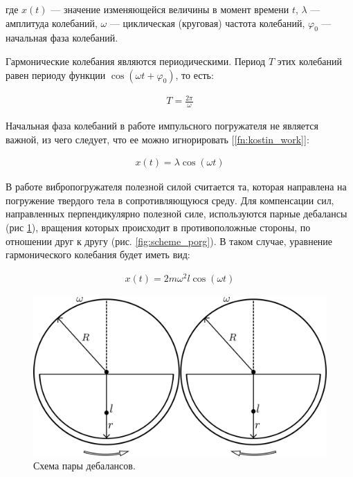 где $x(t)$  — значение изменяющейся величины в момент времени $t$, $\lambda$ — амплитуда колебаний, $\omega$ — циклическая (круговая) частота колебаний, $\varphi_0$ — начальная фаза колебаний.

Гармонические колебания являются периодическими. Период $T$ этих колебаний равен периоду функции $\cos (\omega t + \varphi_0)$, то есть:

\begin{equation*}
    \begin{aligned}
        T = \frac{2 \pi}{\omega}
    \end{aligned}
\end{equation*}

Начальная фаза колебаний в работе импульсного погружателя не является важной, из чего следует, что ее можно игнорировать [\ref{fn:kostin_work}]:


\begin{equation}\label{eq:harmonic_notphi}
    \begin{aligned}
        x(t) = \lambda \cos (\omega t)
    \end{aligned}
\end{equation}

В работе вибропогружателя полезной силой считается та, которая направлена на погружение твердого тела в сопротивляющуюся среду. Для компенсации сил, направленных перпендикулярно полезной силе, используются парные дебалансы (рис \ref{fig:double_debalance}), вращения которых происходит в противоположные стороны, по отношении друг к другу (рис. \ref{fig:scheme_porg}). В таком случае, уравнение гармонического колебания будет иметь вид:

\begin{equation}\label{eq:harmonic_dual}
    \begin{aligned}
        x(t) = 2 m \omega^2 l \cos (\omega t)
    \end{aligned}
\end{equation}


\begin{figure}[h]
    \centering
    \includegraphics[width=0.8\linewidth]{img/double_debalance.png}
    \caption{Схема пары дебалансов.}
    \label{fig:double_debalance}
\end{figure}


